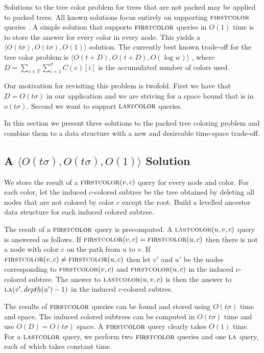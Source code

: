 \documentclass[11pt]{article}
\newcommand{\fca}{\ensuremath{\textsc{firstcolor}}}
\newcommand{\lca}{\ensuremath{\textsc{lastcolor}}}
\newcommand{\la}{\ensuremath{\textsc{la}}}
\begin{document}
Solutions to the tree color problem for trees that are not packed may be applied to packed trees. All known solutions focus entirely on supporting $\fca$ queries \cite{dietz1991finding,muthukrishnan1996time,ferragina1996efficient,alstrup1998marked}. A simple solution that supports $\fca$ queries in $O(1)$ time is to store the answer for every color in every node. This yields a $\langle O(t\sigma),O(t\sigma),O(1)\rangle$ solution. The currently best known trade-off for the tree color problem is $\langle O(t+D),O(t+D),O(\log w)\rangle$  \cite{muthukrishnan1996time}, where $D=\sum_{v\in T}\sum_{i=1}^\sigma C(v)[i]$ is the accumulated number of colors used. 

Our motivation for revisiting this problem is twofold. First we have that $D=O(t\sigma)$ in our application and we are striving for a space bound that is in $o(t\sigma)$. Second we want to support $\lca$ queries. 

In this section we present three solutions to the packed tree coloring problem and combine them to a data structure with a new and desireable time-space trade-off.



\subsection{A $\langle O(t\sigma), O(t\sigma), O(1) \rangle$ Solution}


We store the result of a $\fca(v,c)$ query for every node and color. For each color, let the induced $c$-colored subtree be the tree obtained by deleting all nodes that are not colored by color $c$ except the root. Build a levelled ancestor data structure for each induced colored subtree.

The result of a $\fca$ query is precomputed. A $\lca(u,v,c)$ query is answered as follows. If $\fca(v,c)=\fca(u,c)$ then there is not a node with color $c$ on the path from $u$ to $v$. If $\fca(v,c)\neq \fca(u,c)$ then let $v'$ and $u'$ be the nodes corresponding to $\fca(v,c)$ and $\fca(u,c)$ in the induced $c$-colored subtree. The answer to $\lca(u,v,c)$ is then the answer to $\la(v',depth(u')-1)$ in the induced $c$-colored subtree.

The results of $\fca$ queries can be found and stored using $O(t\sigma)$ time and space. The induced colored subtrees can be computed in $O(t\sigma)$ time and use $O(D)=O(t\sigma)$ space. A $\fca$ query clearly takes $O(1)$ time. For a $\lca$ query, we perform two $\fca$ queries and one $\la$ query, each of which takes constant time.
\end{document}
